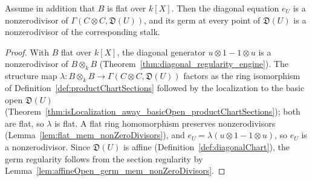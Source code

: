 \begin{theorem}
  \label{thm:diagonalChartEqn_regular}
  \leanok
  Assume in addition that \(B\) is flat over \(k[X]\). Then the diagonal equation \(e_U\) is a
  nonzerodivisor of \(\Gamma(C \otimes C, \mathfrak D(U))\), and its germ at every point of
  \(\mathfrak D(U)\) is a nonzerodivisor of the corresponding stalk.
\end{theorem}
\begin{proof}
  \leanok
  With \(B\) flat over \(k[X]\), the diagonal generator \(u \otimes 1 - 1 \otimes u\) is a
  nonzerodivisor of \(B \otimes_k B\) (Theorem~\ref{thm:diagonal_regularity_engine}). The structure
  map \(\lambda \colon B \otimes_k B \to \Gamma(C \otimes C, \mathfrak D(U))\) factors as the ring
  isomorphism of Definition~\ref{def:productChartSections} followed by the localization to the
  basic open \(\mathfrak D(U)\)
  (Theorem~\ref{thm:isLocalization_away_basicOpen_productChartSections}); both are flat, so
  \(\lambda\) is flat. A flat ring homomorphism preserves nonzerodivisors
  (Lemma~\ref{lem:flat_mem_nonZeroDivisors}), and \(e_U = \lambda(u \otimes 1 - 1 \otimes u)\),
  so \(e_U\) is a nonzerodivisor. Since \(\mathfrak D(U)\) is affine
  (Definition~\ref{def:diagonalChart}), the germ regularity follows from the section regularity by
  Lemma~\ref{lem:affineOpen_germ_mem_nonZeroDivisors}.
\end{proof}

